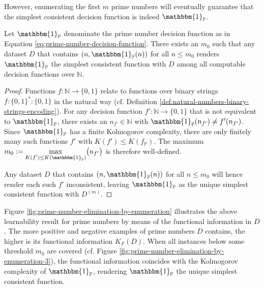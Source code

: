 However, enumerating the first $m$ prime numbers will eventually guarantee that the simplest consistent decision function is indeed $\mathbbm{1}_{\mathbb{P}}$.
\begin{lemma}
	\label{lemma:teaching-prime-numbers-by-enumeration}
	Let $\mathbbm{1}_{\mathbb{P}}$ denominate the prime number decision function as in Equation \ref{eq:prime-number-decision-function}.
	There exists an $m_0$ such that any dataset $D$ that contains $(n,\mathbbm{1}_{\mathbb{P}}(n))$ for all $n\leq m_0$ renders $\mathbbm{1}_{\mathbb{P}}$ the simplest consistent function with $D$ among all computable decision functions over $\mathbb{N}$.
\end{lemma}
\begin{proof}
	Functions $f:\mathbb{N}\to\{0,1\}$ relate to functions over binary strings $f:\{0,1\}^{*}:\{0,1\}$ in the natural way (cf. Definition \ref{def:natural-numbers-binary-strings-encoding}).
	For any decision function $f':\mathbb{N}\to\{0,1\}$ that is not equivalent to $\mathbbm{1}_{\mathbb{P}}$, there exists an $n_{f'}\in\mathbb{N}$ with $\mathbbm{1}_{\mathbb{P}}(n_{f'})\neq f'(n_{f'})$.
	Since $\mathbbm{1}_{\mathbb{P}}$ has a finite Kolmogorov complexity, there are only finitely many such functions $f'$ with $K(f')\leq K(f_{\mathbb{P}})$.
	The maximum $m_0:=\underset{\substack{K(f')\leq K(\mathbbm{1}_{\mathbb{P}})}}{\max}\bigl(n_{f'}\bigr)$ is therefore well-defined.
	
	Any dataset $D$ that contains $(n,\mathbbm{1}_{\mathbb{P}}(n))$ for all $n\leq m_0$ will hence render each such $f'$ inconsistent, leaving $\mathbbm{1}_{\mathbb{P}}$ as the unique simplest consistent function with $D^{(m)}$.
\end{proof}
Figure \ref{fig:prime-number-elimination-by-enumeration} illustrates the above learnability result for prime numbers by means of the functional information in $D$. The more positive and negative examples of prime numbers $D$ contains, the higher is its functional information $K_F(D)$.
When all instances below some threshold $m_0$ are covered (cf. Figure \ref{fig:prime-number-elimination-by-enumeration-3}), the functional information coincides with the Kolmogorov complexity of $\mathbbm{1}_{\mathbb{P}}$, rendering $\mathbbm{1}_{\mathbb{P}}$ the unique simplest consistent function.

